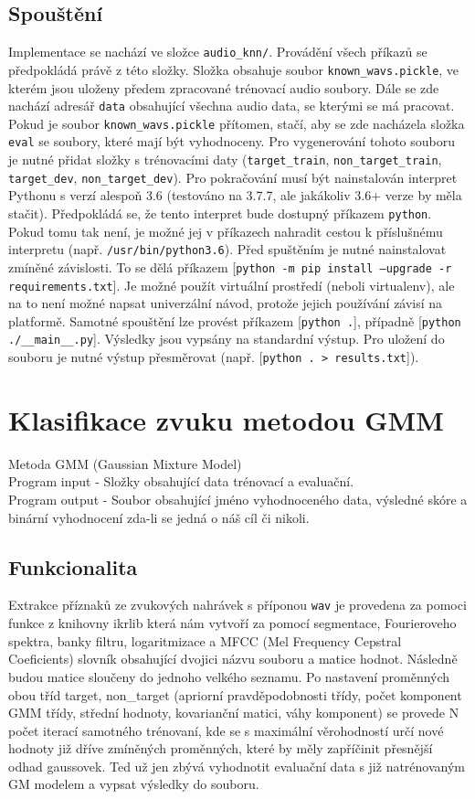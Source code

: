 \documentclass[a4paper,11pt]{article}
\begin{document}
			\subsection{Spouštění}
				Implementace se nachází ve složce \texttt{audio\_knn/}. Provádění všech příkazů se předpokládá právě z této složky. Složka obsahuje soubor \texttt{known\_wavs.pickle}, ve kterém jsou uloženy předem zpracované trénovací audio soubory.
				Dále se zde nachází adresář \texttt{data} obsahující všechna audio data, se kterými se má pracovat. Pokud je soubor \texttt{known\_wavs.pickle} přítomen, stačí, aby se zde nacházela složka \texttt{eval} se soubory, které mají být vyhodnoceny. Pro vygenerování tohoto souboru je nutné přidat složky s trénovacími daty (\texttt{target\_train}, \texttt{non\_target\_train}, \texttt{target\_dev}, \texttt{non\_target\_dev}).
				Pro pokračování musí být nainstalován interpret Pythonu s verzí alespoň 3.6 (testováno na 3.7.7, ale jakákoliv 3.6+ verze by měla stačit). Předpokládá se, že tento interpret bude dostupný příkazem \texttt{python}. Pokud tomu tak není, je možné jej v příkazech nahradit cestou k příslušnému interpretu (např. \texttt{/usr/bin/python3.6}).
				Před spuštěním je nutné nainstalovat zmíněné závislosti. To se dělá příkazem [\texttt{python -m pip install --upgrade -r requirements.txt}]. Je možné použít virtuální prostředí (neboli virtualenv), ale na to není možné napsat univerzální návod, protože jejich používání závisí na platformě.
				Samotné spouštění lze provést příkazem [\texttt{python .}], případně [\texttt{python ./\_\_main\_\_.py}]. Výsledky jsou vypsány na standardní výstup. Pro uložení do souboru je nutné výstup přesměrovat (např. [\texttt{python . > results.txt}]).
				
	\section{Klasifikace zvuku metodou GMM}
		Metoda GMM (Gaussian Mixture Model) \\
		Program input - Složky obsahující data trénovací a evaluační. \\
		Program output - Soubor obsahující jméno vyhodnoceného data, výsledné skóre a binární vyhodnocení zda-li se jedná o náš cíl či nikoli.

			\subsection{Funkcionalita}
				Extrakce příznaků ze zvukových nahrávek s příponou \texttt{wav} je provedena za pomoci funkce z knihovny ikrlib která nám vytvoří za pomocí segmentace, Fourieroveho spektra, banky filtru, logaritmizace a MFCC (Mel Frequency Cepstral Coeficients) slovník obsahující dvojici názvu souboru a matice hodnot. Následně budou matice sloučeny do jednoho velkého seznamu. Po nastavení proměnných obou tříd target, non\_target (apriorní pravděpodobnosti třídy, počet komponent GMM třídy, střední hodnoty, kovarianční matici, váhy komponent) se provede N počet iterací samotného trénovaní, kde se s maximální věrohodností určí nové hodnoty již dříve zmíněných proměnných, které by měly zapříčinit přesnější odhad gaussovek. Ted už jen zbývá vyhodnotit evaluační data s již natrénovaným GM modelem a vypsat výsledky do souboru.
\end{document}
